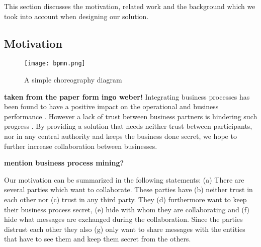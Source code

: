 \documentclass[runningheads]{llncs}
\newcommand{\ber}[1]{(\lowercase\expandafter{#1\relax})} %
\begin{document}
This section discusses the motivation, related work and the background which we took into account when designing our solution.


\subsection{Motivation} \label{sec:motivation}


\begin{figure}
    \centering
    \texttt{[image: bpmn.png]}
    \caption{A simple choreography diagram}
    \label{fig:simple_bpmn}
\end{figure}

\textbf{taken from the paper form ingo weber!}
Integrating business processes has been found to have a positive impact on the operational and business performance \cite{flynn2010impact,narayanan2011antecedents}. However a lack of trust between business partners is hindering such progress \cite{panayides2009impact}. By providing a solution that needs neither trust between participants, nor in any central authority and keeps the business done secret, we hope to further increase collaboration between businesses. 

\textbf{mention business process mining?} \cite{van2007business}



Our motivation can be summarized in the following statements: \ber{a} There are several parties which want to collaborate. These parties have \ber{b} neither trust in each other nor \ber{c} trust in any third party. They \ber{d} furthermore want to keep their business process secret, \ber{e} hide with whom they are collaborating and \ber{f} hide what messages are exchanged during the collaboration. Since the parties distrust each other they also \ber{g} only want to share messages with the entities that have to see them and keep them secret from the others.

\begin{comment}
\begin{itemize}
    \item there are several parties who want to collaborate 
    \item parties have no trust in each other 
    \item parties have no trust in a third party
    \item parties have strong interest in keeping things secret
\end{itemize}
\end{comment}
\end{document}
